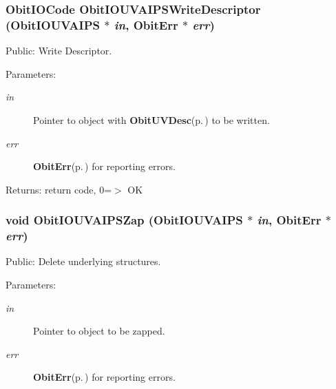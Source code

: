 \subsubsection{\setlength{\rightskip}{0pt plus 5cm}Obit\-IOCode Obit\-IOUVAIPSWrite\-Descriptor ({\bf Obit\-IOUVAIPS} $\ast$ {\em in}, {\bf Obit\-Err} $\ast$ {\em err})}\label{ObitIOUVAIPS_8h_a22}


Public: Write Descriptor. 

\begin{Desc}
\item[Parameters:]
\begin{description}
\item[{\em in}]Pointer to object with {\bf Obit\-UVDesc}{\rm (p.\,\pageref{structObitUVDesc})} to be written. \item[{\em err}]{\bf Obit\-Err}{\rm (p.\,\pageref{structObitErr})} for reporting errors. \end{description}
\end{Desc}
\begin{Desc}
\item[Returns:]return code, 0=$>$ OK \end{Desc}
\subsubsection{\setlength{\rightskip}{0pt plus 5cm}void Obit\-IOUVAIPSZap ({\bf Obit\-IOUVAIPS} $\ast$ {\em in}, {\bf Obit\-Err} $\ast$ {\em err})}\label{ObitIOUVAIPS_8h_a8}


Public: Delete underlying structures. 

\begin{Desc}
\item[Parameters:]
\begin{description}
\item[{\em in}]Pointer to object to be zapped. \item[{\em err}]{\bf Obit\-Err}{\rm (p.\,\pageref{structObitErr})} for reporting errors. \end{description}
\end{Desc}
